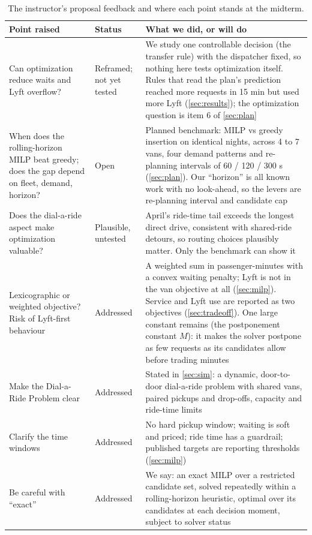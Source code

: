 \documentclass{article}
\begin{document}
\begin{table}[t]
\centering\small
\caption{The instructor's proposal feedback and where each point stands at the midterm.}\label{tab:feedback}
\begin{tabularx}{\textwidth}{@{}P{4.4cm}P{1.9cm}L@{}}
\toprule
\textbf{Point raised} & \textbf{Status} & \textbf{What we did, or will do}\\
\midrule
Can optimization reduce waits and Lyft overflow? & Reframed; not yet tested & We study one controllable decision (the transfer rule) with the dispatcher fixed, so nothing here tests optimization itself. Rules that read the plan's prediction reached more requests in 15 min but used more Lyft (\cref{sec:results}); the optimization question is item 6 of \cref{sec:plan}\\
When does the rolling-horizon MILP beat greedy; does the gap depend on fleet, demand, horizon? & Open & Planned benchmark: MILP vs greedy insertion on identical nights, across 4 to 7 vans, four demand patterns and re-planning intervals of 60 / 120 / 300 s (\cref{sec:plan}). Our ``horizon'' is all known work with no look-ahead, so the levers are re-planning interval and candidate cap\\
Does the dial-a-ride aspect make optimization valuable? & Plausible, untested & April's ride-time tail exceeds the longest direct drive, consistent with shared-ride detours, so routing choices plausibly matter. Only the benchmark can show it\\
Lexicographic or weighted objective? Risk of Lyft-first behaviour & Addressed & A weighted sum in passenger-minutes with a convex waiting penalty; Lyft is not in the van objective at all (\cref{sec:milp}). Service and Lyft use are reported as two objectives (\cref{sec:tradeoff}). One large constant remains (the postponement constant $M$): it makes the solver postpone as few requests as its candidates allow before trading minutes\\
Make the Dial-a-Ride Problem clear & Addressed & Stated in \cref{sec:sim}: a dynamic, door-to-door dial-a-ride problem with shared vans, paired pickups and drop-offs, capacity and ride-time limits\\
Clarify the time windows & Addressed & No hard pickup window; waiting is soft and priced; ride time has a guardrail; published targets are reporting thresholds (\cref{sec:milp})\\
Be careful with ``exact'' & Addressed & We say: an exact MILP over a restricted candidate set, solved repeatedly within a rolling-horizon heuristic, optimal over its candidates at each decision moment, subject to solver status\\
\bottomrule
\end{tabularx}
\end{table}
\end{document}
